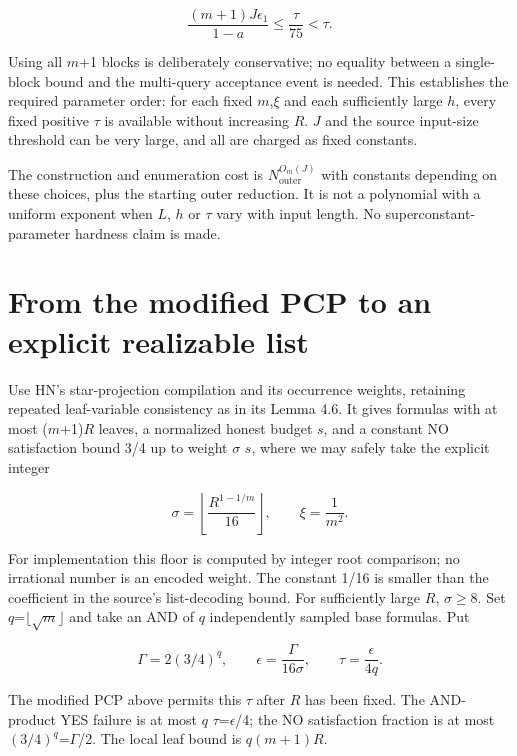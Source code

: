\begin{equation}\label{eq:21}
\frac{(m+1)J\epsilon_1}{1-a}\le\frac{\tau}{75}<\tau.
\end{equation}

Using all \(m\)+1 blocks is deliberately conservative; no equality between a single-block bound and the multi-query acceptance event is needed. This establishes the required parameter order: for each fixed \(m\),\(\xi\) and each sufficiently large \(h\), every fixed positive \(\tau\) is available without increasing \(R\). \(J\) and the source input-size threshold can be very large, and all are charged as fixed constants.

The construction and enumeration cost is \(N_{\mathrm{outer}}^{O_{m}(J)}\) with constants depending on these choices, plus the starting outer reduction. It is not a polynomial with a uniform exponent when \(L\), \(h\) or \(\tau\) vary with input length. No superconstant-parameter hardness claim is made.

\section{From the modified PCP to an explicit realizable list}\label{sec:8}
Use HN's star-projection compilation and its occurrence weights, retaining repeated leaf-variable consistency as in its Lemma 4.6. It gives formulas with at most (\(m\)+1)\(R\) leaves, a normalized honest budget \(s\), and a constant NO satisfaction bound 3/4 up to weight \(\sigma\) \(s\), where we may safely take the explicit integer

\begin{equation}\label{eq:22}
\sigma=\left\lfloor\frac{R^{1-1/m}}{16}\right\rfloor,\qquad\xi=\frac1{m^2}.
\end{equation}

For implementation this floor is computed by integer root comparison; no irrational number is an encoded weight. The constant 1/16 is smaller than the coefficient in the source's list-decoding bound. For sufficiently large \(R\), \(\sigma\)\(\ge\)8. Set \(q\)=\(\lfloor \sqrt{m}\rfloor\) and take an AND of \(q\) independently sampled base formulas. Put

\begin{equation}\label{eq:23}
\Gamma=2(3/4)^q,\qquad\epsilon=\frac{\Gamma}{16\sigma},\qquad\tau=\frac{\epsilon}{4q}.
\end{equation}

The modified PCP above permits this \(\tau\) after \(R\) has been fixed. The AND-product YES failure is at most \(q\) \(\tau\)=\(\epsilon\)/4; the NO satisfaction fraction is at most \((3/4)^q\)=\(\Gamma\)/2. The local leaf bound is \(q(m+1)\)\(R\).

